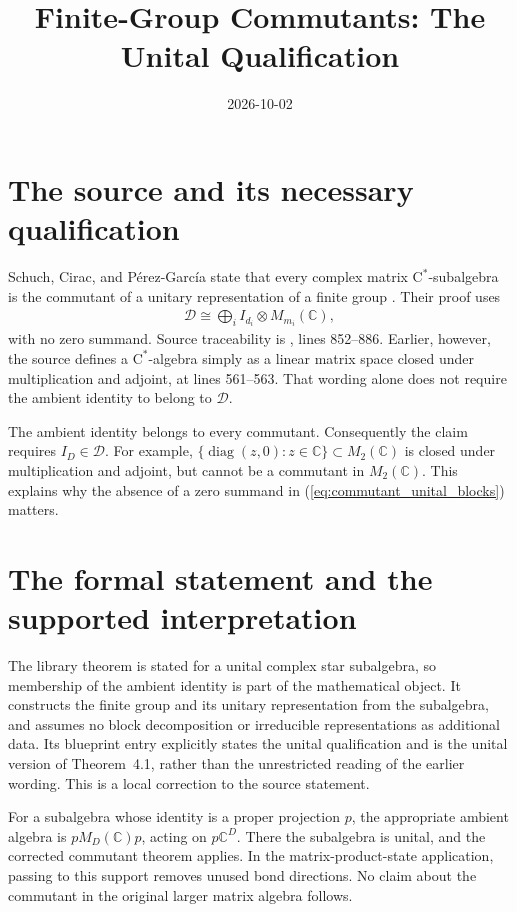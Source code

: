 \documentclass{article}
\title{Finite-Group Commutants: The Unital Qualification}
\author{}
\date{2026-10-02}
\begin{document}
\maketitle
{}

\section{The source and its necessary qualification}
Schuch, Cirac, and P\'erez-Garc\'ia state that every complex matrix
$\mathrm C^*$-subalgebra is the commutant of a unitary representation
of a finite group \cite[Theorem~4.1]{Schuch2010PEPS}. Their proof uses
\begin{align}
    \mathcal D\cong\bigoplus_i I_{d_i}\otimes M_{m_i}(\mathbb C),
    \label{eq:commutant_unital_blocks}
\end{align}
with no zero summand. Source traceability is
, lines 852--886. Earlier, however,
the source defines a $\mathrm C^*$-algebra simply as a linear matrix
space closed under multiplication and adjoint, at lines 561--563.
That wording alone does not require the ambient identity to belong to
$\mathcal D$.

The ambient identity belongs to every commutant. Consequently the
claim requires $I_D\in\mathcal D$. For example,
$\{\operatorname{diag}(z,0):z\in\mathbb C\}\subset M_2(\mathbb C)$
is closed under multiplication and adjoint, but cannot be a commutant
in $M_2(\mathbb C)$. This explains why the absence of a zero summand
in (\ref{eq:commutant_unital_blocks}) matters.

\section{The formal statement and the supported interpretation}
The library theorem is stated for a unital complex star subalgebra,
so membership of the ambient identity is part of the mathematical
object. It constructs the finite group and its unitary representation
from the subalgebra, and assumes no block decomposition or irreducible
representations as additional data. Its blueprint entry explicitly
states the unital qualification and is the unital version of
Theorem~4.1, rather than the unrestricted reading of the earlier
wording. This is a local correction to the source statement.

For a subalgebra whose identity is a proper projection $p$, the
appropriate ambient algebra is $pM_D(\mathbb C)p$, acting on
$p\mathbb C^D$. There the subalgebra is unital, and the corrected
commutant theorem applies. In the matrix-product-state application,
passing to this support removes unused bond directions. No claim
about the commutant in the original larger matrix algebra follows.



\end{document}
